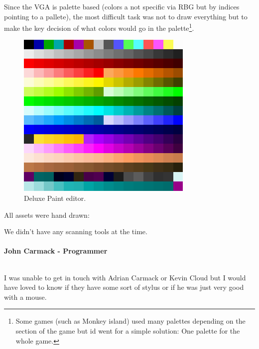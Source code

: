 \documentclass[book.tex]{subfiles}
\begin{document}
Since the VGA is palette based (colors a not specific via RBG but by indices pointing to a pallete), the most difficult task was not to draw everything but to make the key decision of what colors would go in the palette\footnote{Some games (such as Monkey island) used many palettes depending on the section of the game but id went for a simple solution: One palette for the whole game.}.\\
\begin{figure}[H]
  \centering
 \includegraphics[width=\textwidth]{imgs/palette.png}
 \caption{Deluxe Paint editor.}
\end{figure}

All assets were hand drawn:\\
\begin{fancyquotes}
We didn't have any scanning tools at the time.\\
\\
\textbf{John Carmack - Programmer}
\end{fancyquotes}
\\
I was unable to get in touch with Adrian Carmack or Kevin Cloud but I would have loved to know if they have some sort of stylus or if he was just very good with a mouse.\\
\end{document}
